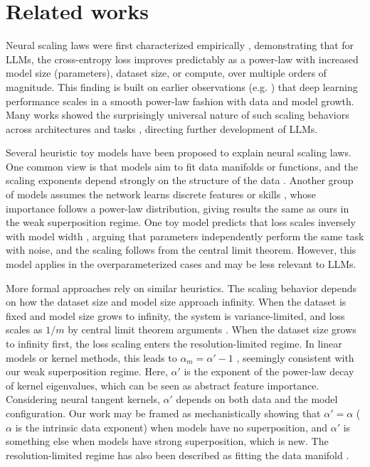 \documentclass{article}
\begin{document}
\section{Related works}\label{sec:relate}

Neural scaling laws were first characterized empirically \cite{kaplan2020scaling}, demonstrating that for LLMs, the cross-entropy loss improves predictably as a power-law with increased model size (parameters), dataset size, or compute, over multiple orders of magnitude. This finding is built on earlier observations (e.g. \cite{hestness2017deep}) that deep learning performance scales in a smooth power-law fashion with data and model growth. Many works showed the surprisingly universal nature of such scaling behaviors across architectures and tasks \cite{kaplan2020scaling,hoffmann2022chinchilla,henighan2020scaling}, directing further development of LLMs.

Several heuristic toy models have been proposed to explain neural scaling laws. One common view is that models aim to fit data manifolds or functions, and the scaling exponents depend strongly on the structure of the data \cite{sharma2022neural,bahri2024explaining}. Another group of models assumes the network learns discrete features or skills \cite{hutter2021learning,michaud2023quantization}, whose importance follows a power-law distribution, giving results the same as ours in the weak superposition regime. One toy model predicts that loss scales inversely with model width \cite{song2024resourcemodelneuralscaling}, arguing that parameters independently perform the same task with noise, and the scaling follows from the central limit theorem. However, this model applies in the overparameterized cases and may be less relevant to LLMs.

More formal approaches rely on similar heuristics. The scaling behavior depends on how the dataset size and model size approach infinity. When the dataset is fixed and model size grows to infinity, the system is variance-limited, and loss scales as $1/m$ by central limit theorem arguments \cite{bahri2024explaining}. When the dataset size grows to infinity first, the loss scaling enters the resolution-limited regime. In linear models or kernel methods, this leads to $\alpha_m = \alpha' - 1$ \cite{bahri2024explaining,bordelon2020spectrum,bordelon2025feature,maloney2022solvable}, seemingly consistent with our weak superposition regime. Here, $\alpha'$ is the exponent of the power-law decay of kernel eigenvalues, which can be seen as abstract feature importance. Considering neural tangent kernels, $\alpha'$ depends on both data and the model configuration. Our work may be framed as mechanistically showing that $\alpha' = \alpha$ ($\alpha$ is the intrinsic data exponent) when models have no superposition, and $\alpha'$ is something else when models have strong superposition, which is new. The resolution-limited regime has also been described as fitting the data manifold \cite{bahri2024explaining}. 
\end{document}

